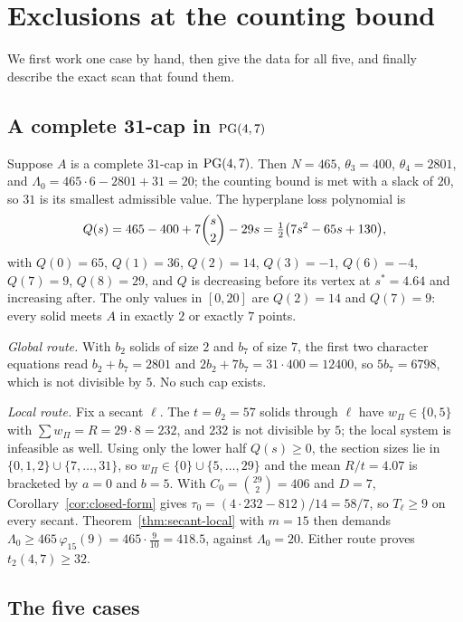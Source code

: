\section{Exclusions at the counting bound}
\label{sec:exclusions}

We first work one case by hand, then give the data for all five, and
finally describe the exact scan that found them.

\subsection{A complete 31-cap in \texorpdfstring{\(\mathrm{PG}(4,7)\)}{PG(4,7)}}

Suppose \(A\) is a complete \(31\)-cap in \(\mathrm{PG}(4,7)\).  Then \(N=465\),
\(\theta_3=400\), \(\theta_4=2801\), and
\(\Lambda_0=465\cdot6-2801+31=20\); the counting bound is met with a slack
of \(20\), so \(31\) is its smallest admissible value.  The hyperplane
loss polynomial is
\[
 Q(s)=465-400+7\binom{s}{2}-29s=\tfrac12\bigl(7s^2-65s+130\bigr),
\]
with \(Q(0)=65\), \(Q(1)=36\), \(Q(2)=14\), \(Q(3)=-1\), \(Q(6)=-4\),
\(Q(7)=9\), \(Q(8)=29\), and \(Q\) is decreasing before its vertex at
\(s^*=4.64\) and increasing after.  The only values in \([0,20]\) are
\(Q(2)=14\) and \(Q(7)=9\): every solid meets \(A\) in exactly \(2\) or
exactly \(7\) points.

\emph{Global route.}  With \(b_2\) solids of size \(2\) and \(b_7\) of
size \(7\), the first two character equations read
\(b_2+b_7=2801\) and \(2b_2+7b_7=31\cdot400=12400\), so
\(5b_7=6798\), which is not divisible by \(5\).  No such cap exists.

\emph{Local route.}  Fix a secant \(\ell\).  The \(t=\theta_2=57\)
solids through \(\ell\) have \(w_\Pi\in\{0,5\}\) with
\(\sum w_\Pi=R=29\cdot8=232\), and \(232\) is not divisible by \(5\); the
local system is infeasible as well.  Using only the lower half
\(Q(s)\ge0\), the section sizes lie in \(\{0,1,2\}\cup\{7,\dots,31\}\),
so \(w_\Pi\in\{0\}\cup\{5,\dots,29\}\) and the mean \(R/t=4.07\) is
bracketed by \(a=0\) and \(b=5\).  With \(C_0=\binom{29}{2}=406\) and
\(D=7\), Corollary~\ref{cor:closed-form} gives
\(\tau_0=(4\cdot232-812)/14=58/7\), so \(T_\ell\ge9\) on every secant.
Theorem~\ref{thm:secant-local} with \(m=15\) then demands
\(\Lambda_0\ge465\,\varphi_{15}(9)=465\cdot\tfrac9{10}=418.5\), against
\(\Lambda_0=20\).  Either route proves \(t_2(4,7)\ge32\).

\subsection{The five cases}

